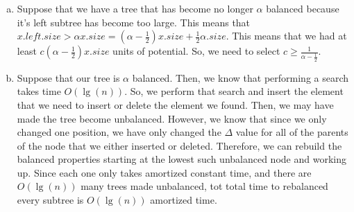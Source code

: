\documentclass{article}
\begin{document}
\begin{enumerate}[a.]
 \item
Suppose that we have a tree that has become no longer $\alpha$ balanced because it's left subtree has become too large. This means that $x.left.size > \alpha x.size = (\alpha -\frac{1}{2}) x.size + \frac{1}{2} \alpha.size$. This means that we had at least $c(\alpha -\frac{1}{2}) x.size$ units of potential. So, we need to select $c \ge \frac{1}{\alpha -\frac{1}{2}}$. 
 \item
 Suppose that our tree is $\alpha$ balanced. Then, we know that performing a search takes time $O(\lg(n))$. So, we perform that search and insert the element that we need to insert or delete the element we found. Then, we may have made the tree become unbalanced. However, we know that since we only changed one position, we have only changed the $\Delta$ value for all of the parents of the node that we either inserted or deleted. Therefore, we can rebuild the balanced properties starting at the lowest such unbalanced node and working up. Since each one only takes amortized constant time, and there are $O(\lg(n))$ many trees made unbalanced, tot total time to rebalanced every subtree is $O(\lg(n))$ amortized time.
 
 
\end{enumerate}
\end{document}
